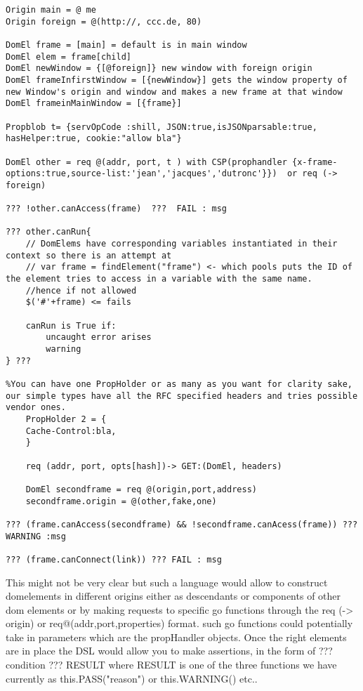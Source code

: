 \begin{verbatim}
Origin main = @ me	
Origin foreign = @(http://, ccc.de, 80)

DomEl frame = [main] = default is in main window
DomEl elem = frame[child] 
DomEl newWindow = {[@foreign]} new window with foreign origin
DomEl frameInfirstWindow = [{newWindow}] gets the window property of new Window's origin and window and makes a new frame at that window
DomEl frameinMainWindow = [{frame}]

Propblob t= {servOpCode :shill, JSON:true,isJSONparsable:true, hasHelper:true, cookie:"allow bla"}

DomEl other = req @(addr, port, t ) with CSP(prophandler {x-frame-options:true,source-list:'jean','jacques','dutronc'}})  or req (-> foreign) 

??? !other.canAccess(frame)  ???  FAIL : msg

??? other.canRun{
	// DomElems have corresponding variables instantiated in their context so there is an attempt at 
	// var frame = findElement("frame") <- which pools puts the ID of the element tries to access in a variable with the same name. 
	//hence if not allowed 
	$('#'+frame) <= fails

	canRun is True if:
		uncaught error arises
		warning
} ??? 

%You can have one PropHolder or as many as you want for clarity sake, our simple types have all the RFC specified headers and tries possible vendor ones.
	PropHolder 2 = {
	Cache-Control:bla,	
	}

	req (addr, port, opts[hash])-> GET:(DomEl, headers)

	DomEl secondframe = req @(origin,port,address)
	secondframe.origin = @(other,fake,one)

??? (frame.canAccess(secondframe) && !secondframe.canAcess(frame)) ??? WARNING :msg

??? (frame.canConnect(link)) ??? FAIL : msg
\end{verbatim}

This might not be very clear but such a language would allow to construct domelements in different origins either as descendants or
components of other dom elements or by making requests to specific go functions through the req (-> origin) or req@(addr,port,properties) format.
such go functions could potentially take in parameters which are the propHandler objects. 
Once the right elements are in place the DSL would allow you to make assertions, in the form of ??? condition ??? RESULT where RESULT is one of the
three functions we have currently as this.PASS("reason") or this.WARNING() etc..

